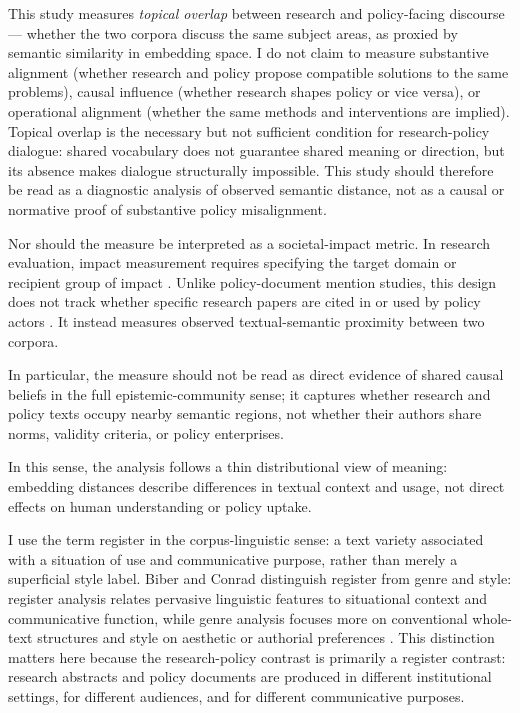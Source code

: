 \documentclass[12pt,a4paper]{article}
\begin{document}
This study measures \emph{topical overlap} between research and policy-facing discourse --- whether the two corpora discuss the same subject areas, as proxied by semantic similarity in embedding space. I do not claim to measure substantive alignment (whether research and policy propose compatible solutions to the same problems), causal influence (whether research shapes policy or vice versa), or operational alignment (whether the same methods and interventions are implied). Topical overlap is the necessary but not sufficient condition for research-policy dialogue: shared vocabulary does not guarantee shared meaning or direction, but its absence makes dialogue structurally impossible. This study should therefore be read as a diagnostic analysis of observed semantic distance, not as a causal or normative proof of substantive policy misalignment.

Nor should the measure be interpreted as a societal-impact metric. In research evaluation, impact measurement requires specifying the target domain or recipient group of impact \parencite{bornmann2017impact}. Unlike policy-document mention studies, this design does not track whether specific research papers are cited in or used by policy actors \parencite{bornmann2016policy}. It instead measures observed textual-semantic proximity between two corpora.

In particular, the measure should not be read as direct evidence of shared causal beliefs in the full epistemic-community sense; it captures whether research and policy texts occupy nearby semantic regions, not whether their authors share norms, validity criteria, or policy enterprises.

In this sense, the analysis follows a thin distributional view of meaning: embedding distances describe differences in textual context and usage, not direct effects on human understanding or policy uptake.

I use the term register in the corpus-linguistic sense: a text variety associated with a situation of use and communicative purpose, rather than merely a superficial style label. Biber and Conrad distinguish register from genre and style: register analysis relates pervasive linguistic features to situational context and communicative function, while genre analysis focuses more on conventional whole-text structures and style on aesthetic or authorial preferences \parencite{biberConrad2009register}. This distinction matters here because the research-policy contrast is primarily a register contrast: research abstracts and policy documents are produced in different institutional settings, for different audiences, and for different communicative purposes.
\end{document}
